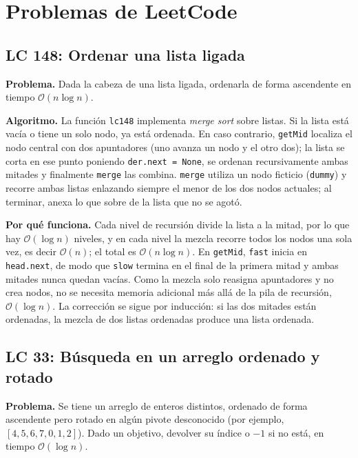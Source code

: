 \documentclass[11pt,letterpaper]{article}
\newcommand{\bigO}[1]{\ensuremath{\mathcal{O}(#1)}}
\begin{document}
\clearpage

\section{Problemas de LeetCode}

\subsection{LC 148: Ordenar una lista ligada}

\textbf{Problema.} Dada la cabeza de una lista ligada, ordenarla de forma ascendente en tiempo \bigO{n \log n}.

\textbf{Algoritmo.} La función \texttt{lc148} implementa \emph{merge sort} sobre listas. Si la lista está vacía o tiene un solo nodo, ya está ordenada. En caso contrario, \texttt{getMid} localiza el nodo central con dos apuntadores (uno avanza un nodo y el otro dos); la lista se corta en ese punto poniendo \texttt{der.next = None}, se ordenan recursivamente ambas mitades y finalmente \texttt{merge} las combina. \texttt{merge} utiliza un nodo ficticio (\texttt{dummy}) y recorre ambas listas enlazando siempre el menor de los dos nodos actuales; al terminar, anexa lo que sobre de la lista que no se agotó.

\textbf{Por qué funciona.} Cada nivel de recursión divide la lista a la mitad, por lo que hay \bigO{\log n} niveles, y en cada nivel la mezcla recorre todos los nodos una sola vez, es decir \bigO{n}; el total es \bigO{n \log n}. En \texttt{getMid}, \texttt{fast} inicia en \texttt{head.next}, de modo que \texttt{slow} termina en el final de la primera mitad y ambas mitades nunca quedan vacías. Como la mezcla solo reasigna apuntadores y no crea nodos, no se necesita memoria adicional más allá de la pila de recursión, \bigO{\log n}. La corrección se sigue por inducción: si las dos mitades están ordenadas, la mezcla de dos listas ordenadas produce una lista ordenada.

\subsection{LC 33: Búsqueda en un arreglo ordenado y rotado}

\textbf{Problema.} Se tiene un arreglo de enteros distintos, ordenado de forma ascendente pero rotado en algún pivote desconocido (por ejemplo, $[4,5,6,7,0,1,2]$). Dado un objetivo, devolver su índice o $-1$ si no está, en tiempo \bigO{\log n}.
\end{document}
